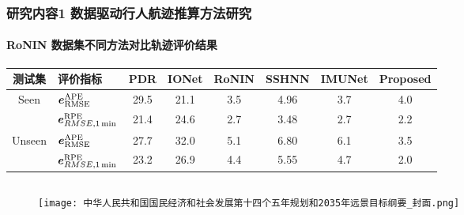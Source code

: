 \begin{frame}[t]
	\frametitle{研究内容1 数据驱动行人航迹推算方法研究}
	\framesubtitle{RoNIN 数据集不同方法对比轨迹评价结果}
    {   
        \tiny        
		\begin{tabular*}{\linewidth}{@{\extracolsep{\fill}} cl cccccc}
			\toprule
			测试集                   & 评价指标                                        & PDR  & IONet & RoNIN & SSHNN & IMUNet & Proposed \\
			\midrule
			\multirow{2}{*}{Seen}   & $\vb*{e}^{\mathrm{APE}}_{\mathrm{RMSE}}$        & 29.5 & 21.1  & 3.5   & 4.96  & 3.7    & 4.0 \\
			                        & $\vb*{e}^{\mathrm{RPE}}_{RMSE,\SI{1}{\minute}}$ & 21.4 & 24.6  & 2.7   & 3.48  & 2.7    & 2.2 \\
			\multirow{2}{*}{Unseen} & $\vb*{e}^{\mathrm{APE}}_{\mathrm{RMSE}}$        & 27.7 & 32.0  & 5.1   & 6.80  & 6.1    & 3.5 \\
						            & $\vb*{e}^{\mathrm{RPE}}_{RMSE,\SI{1}{\minute}}$ & 23.2 & 26.9  & 4.4   & 5.55  & 4.7    & 2.0 \\
			\bottomrule 
		\end{tabular*}     
   	}
	\begin{columns}[t]
		\begin{column}{0.5\textwidth}
		   	\begin{figure}
    			\texttt{[image: 中华人民共和国国民经济和社会发展第十四个五年规划和2035年远景目标纲要\_封面.png]}
		   	\end{figure}
		\end{column}   
		\begin{column}{0.5\textwidth}

		\end{column}
	\end{columns} 
\end{frame}

